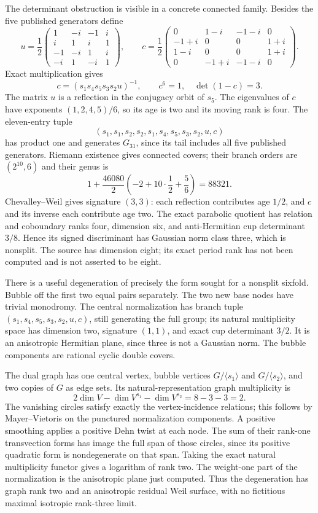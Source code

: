The determinant obstruction is visible in a concrete connected family.
Besides the five published generators define
\[
u=\frac12\begin{pmatrix}
1&-i&-1&i\\i&1&i&1\\-1&-i&1&i\\-i&1&-i&1
\end{pmatrix},\qquad
c=\frac12\begin{pmatrix}
0&1-i&-1-i&0\\-1+i&0&0&1+i\\
1-i&0&0&1+i\\0&-1+i&-1-i&0
\end{pmatrix}.
\]
Exact multiplication gives
\[
          c=(s_1s_4s_5s_3s_2u)^{-1},\qquad
          c^6=1,\quad \det(1-c)=3.
\]
The matrix \(u\) is a reflection in the conjugacy orbit of \(s_5\).
The eigenvalues of \(c\) have exponents \((1,2,4,5)/6\), so its
age is two and its moving rank is four. The eleven-entry tuple
\[
       (s_1,s_1,s_2,s_2,s_1,s_4,s_5,s_3,s_2,u,c)
\]
has product one and generates \(G_{31}\), since its tail includes
all five published generators. Riemann existence gives connected covers;
their branch orders are \((2^{10},6)\) and their genus is
\[
           1+\frac{46080}{2}\left(-2+10\cdot\frac12+\frac56\right)
                       =88321.
\]
Chevalley--Weil gives signature \((3,3)\): each reflection contributes
age \(1/2\), and \(c\) and its inverse each contribute age two.
The exact parabolic quotient has relation and coboundary ranks four,
dimension six, and anti-Hermitian cup determinant \(3/8\). Hence its
signed discriminant has Gaussian norm class three, which is nonsplit.
The source has dimension eight; its exact period rank has not been
computed and is not asserted to be eight.

There is a useful degeneration of precisely the form sought for a
nonsplit sixfold. Bubble off the first two equal pairs separately.
The two new base nodes have trivial monodromy. The central normalization
has branch tuple
\((s_1,s_4,s_5,s_3,s_2,u,c)\), still generating the full group;
its natural multiplicity space has dimension two, signature \((1,1)\),
and exact cup determinant \(3/2\). It is an anisotropic Hermitian plane,
since three is not a Gaussian norm. The bubble components are rational
cyclic double covers.

The dual graph has one central vertex, bubble vertices
\(G/\langle s_1\rangle\) and \(G/\langle s_2\rangle\), and two
copies of \(G\) as edge sets. Its natural-representation graph
multiplicity is
\[
             2\dim V-\dim V^{s_1}-\dim V^{s_2}=8-3-3=2.
\]
The vanishing circles satisfy exactly the vertex-incidence relations;
this follows by Mayer--Vietoris on the punctured normalization
components. A positive smoothing applies a positive Dehn twist at
each node. The sum of their rank-one transvection forms has image the
full span of those circles, since its positive quadratic form is
nondegenerate on that span. Taking the exact natural multiplicity
functor gives a logarithm of rank two. The weight-one part of the
normalization is the anisotropic plane just computed. Thus the
degeneration has graph rank two and an anisotropic residual Weil surface,
with no fictitious maximal isotropic rank-three limit.

